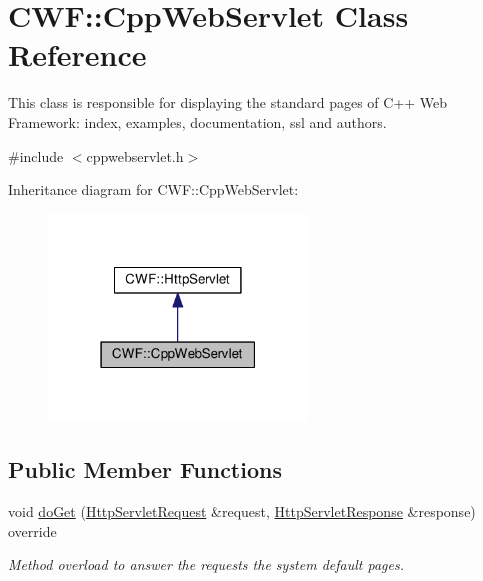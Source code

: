 \hypertarget{class_c_w_f_1_1_cpp_web_servlet}{\section{C\+W\+F\+:\+:Cpp\+Web\+Servlet Class Reference}
\label{class_c_w_f_1_1_cpp_web_servlet}
}


This class is responsible for displaying the standard pages of C++ Web Framework\+: index, examples, documentation, ssl and authors.  




{\ttfamily \#include $<$cppwebservlet.\+h$>$}



Inheritance diagram for C\+W\+F\+:\+:Cpp\+Web\+Servlet\+:\nopagebreak
\begin{figure}[H]
\begin{center}
\leavevmode
\includegraphics[width=195pt]{class_c_w_f_1_1_cpp_web_servlet__inherit__graph}
\end{center}
\end{figure}
\subsection*{Public Member Functions}
\begin{DoxyCompactItemize}
\item 
void \hyperlink{class_c_w_f_1_1_cpp_web_servlet_a0dca0ce47c2c1d8ecd8d8493773575f8}{do\+Get} (\hyperlink{class_c_w_f_1_1_http_servlet_request}{Http\+Servlet\+Request} \&request, \hyperlink{class_c_w_f_1_1_http_servlet_response}{Http\+Servlet\+Response} \&response) override
\begin{DoxyCompactList}\small\item\em Method overload to answer the requests the system default pages. \end{DoxyCompactList}\end{DoxyCompactItemize}



